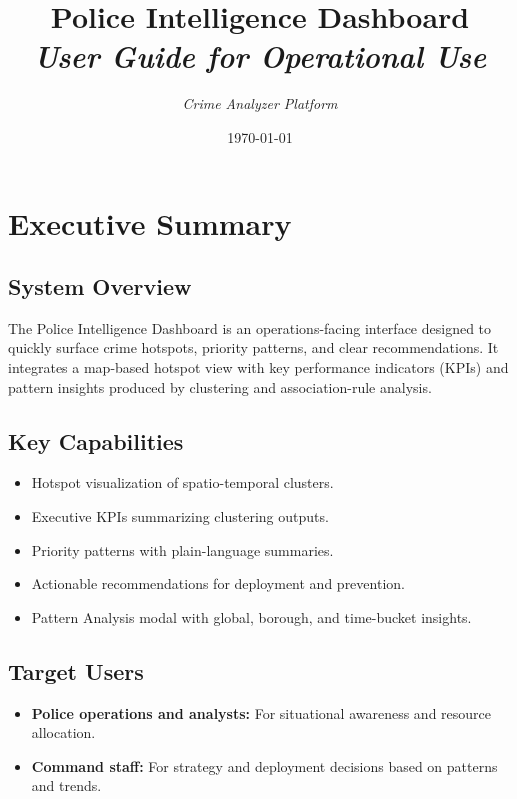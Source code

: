 \documentclass[11pt]{article}
\title{\Huge\textbf{Police Intelligence Dashboard}\\[2mm]
       \Large\textit{User Guide for Operational Use}}
\author{\textit{Crime Analyzer Platform}}
\date{\today}
\begin{document}
\maketitle
\tableofcontents
\newpage

\section{Executive Summary}

\subsection{System Overview}
The Police Intelligence Dashboard is an operations-facing interface designed to quickly surface crime hotspots, priority patterns, and clear recommendations. It integrates a map-based hotspot view with key performance indicators (KPIs) and pattern insights produced by clustering and association-rule analysis.

\subsection{Key Capabilities}
\begin{itemize}[leftmargin=*]
  \item Hotspot visualization of spatio-temporal clusters.
  \item Executive KPIs summarizing clustering outputs.
  \item Priority patterns with plain-language summaries.
  \item Actionable recommendations for deployment and prevention.
  \item Pattern Analysis modal with global, borough, and time-bucket insights.
\end{itemize}

\subsection{Target Users}
\begin{itemize}[leftmargin=*]
  \item \textbf{Police operations and analysts:} For situational awareness and resource allocation.
  \item \textbf{Command staff:} For strategy and deployment decisions based on patterns and trends.
\end{itemize}

\end{document}
